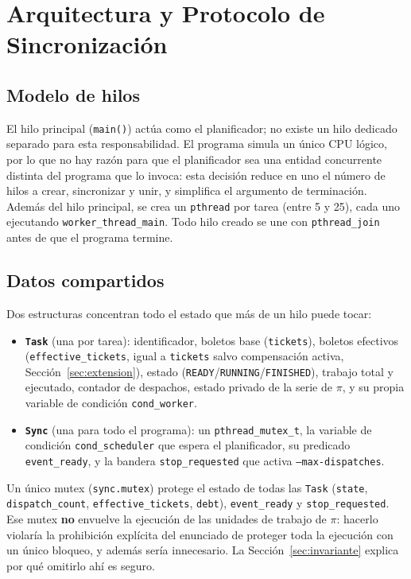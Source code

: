 \section{Arquitectura y Protocolo de Sincronización}
\label{sec:arquitectura}

\subsection{Modelo de hilos}

El hilo principal (\texttt{main()}) actúa como el planificador; no existe un
hilo dedicado separado para esta responsabilidad. El programa simula un
único CPU lógico, por lo que no hay razón para que el planificador sea una
entidad concurrente distinta del programa que lo invoca: esta decisión
reduce en uno el número de hilos a crear, sincronizar y unir, y simplifica el
argumento de terminación. Además del hilo principal, se crea un
\texttt{pthread} por tarea (entre 5 y 25), cada uno ejecutando
\texttt{worker\_thread\_main}. Todo hilo creado se une con
\texttt{pthread\_join} antes de que el programa termine.

\subsection{Datos compartidos}

Dos estructuras concentran todo el estado que más de un hilo puede tocar:

\begin{itemize}
\item \textbf{\texttt{Task}} (una por tarea): identificador, boletos base
  (\texttt{tickets}), boletos efectivos (\texttt{effective\_tickets}, igual a
  \texttt{tickets} salvo compensación activa, Sección~\ref{sec:extension}),
  estado (\texttt{READY}/\texttt{RUNNING}/\texttt{FINISHED}), trabajo total y
  ejecutado, contador de despachos, estado privado de la serie de $\pi$, y su
  propia variable de condición \texttt{cond\_worker}.
\item \textbf{\texttt{Sync}} (una para todo el programa): un
  \texttt{pthread\_mutex\_t}, la variable de condición
  \texttt{cond\_scheduler} que espera el planificador, su predicado
  \texttt{event\_ready}, y la bandera \texttt{stop\_requested} que activa
  \texttt{--max-dispatches}.
\end{itemize}

Un único mutex (\texttt{sync.mutex}) protege el estado de todas las
\texttt{Task} (\texttt{state}, \texttt{dispatch\_count},
\texttt{effective\_tickets}, \texttt{debt}), \texttt{event\_ready} y
\texttt{stop\_requested}. Ese mutex \textbf{no} envuelve la ejecución de las
unidades de trabajo de $\pi$: hacerlo violaría la prohibición explícita del
enunciado de proteger toda la ejecución con un único bloqueo, y además sería
innecesario. La Sección~\ref{sec:invariante} explica por qué omitirlo ahí es
seguro.

